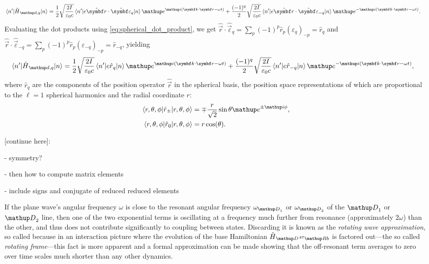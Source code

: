 \begin{align}
\matrixel{n^\prime}{\hat H_{\up{d},q}}{n} &= 
\frac12\sqrt{\frac{2I}{\varepsilon_0 c}}
\matrixel{n^\prime}
  {e\hat{\vec r}\cdot\hat{\vec\varepsilon}_q}
  {n}\ee^{\ii(\vec k \cdot \vec r - \omega t)}
+\frac{(-1)^q}2\sqrt{\frac{2I}{\varepsilon_0 c}}
\matrixel{n^\prime}
  {e\hat{\vec r}\cdot\hat{\vec\varepsilon}_{-q}}
  {n} \ee^{-\ii(\vec k \cdot \vec r - \omega t)}.
\end{align}
Evaluating the dot products using \eqref{eq:spherical_dot_product}, we get $\hat{\vec r}\cdot \hat{\vec\varepsilon}_q = \sum_p (-1)^p \hat r_p (\varepsilon_q)_{-p} = \hat r_q$ and $\hat{\vec r}\cdot \hat{\vec\varepsilon}_{-q} = \sum_p (-1)^p \hat r_p (\varepsilon_{-q})_{-p} = \hat r_{-q}$, yielding
\begin{align}
\matrixel{n^\prime}{\hat H_{\up{d},q}}{n} &= 
\frac12\sqrt{\frac{2I}{\varepsilon_0 c}}
\matrixel{n^\prime}
  {e\hat r_q}
  {n}\ee^{\ii(\vec k \cdot \vec r - \omega t)}
+\frac{(-1)^q}2\sqrt{\frac{2I}{\varepsilon_0 c}}
\matrixel{n^\prime}
  {e\hat r_{-q}}
  {n} \ee^{-\ii(\vec k \cdot \vec r - \omega t)},
\end{align}
where $\hat r_q$ are the components of the position operator $\hat{\vec r}$ in the spherical basis, the position space representations of which are proportional to the $\ell=1$ spherical harmonics and the radial coordinate $r$:
\begin{align}
\matrixel{r, \theta, \phi}{\hat r_\pm}{r, \theta, \phi}
    &= \mp\frac r {\sqrt2}\sin\theta\ee^{\pm\ii\phi},\\
\matrixel{r, \theta, \phi}{\hat r_0}{r, \theta, \phi} &= r\cos(\theta).
\end{align}

[continue here]:

- symmetry?

- then how to compute matrix elements

- include signs and conjugate of reduced reduced elements

If the plane wave's angular frequency $\omega$ is close to the resonant angular frequency $\omega_{\up{D}_1}$ or $\omega_{\up{D}_2}$ of the $\up{D}_1$ or $\up{D}_2$ line, then one of the two exponential terms is oscillating at a frequency much further from resonance (approximately $2\omega$) than the other, and thus does not contribute significantly to coupling between states. Discarding it is known as the \emph{rotating wave approximation}, so called because in an interaction picture where the evolution of the base Hamiltonian $\hat H_{\up{D}\,^{87}\up{Rb}}$ is factored out---the so called \emph{rotating frame}---this fact is more apparent and a formal approximation can be made showing that the off-resonant term averages to zero over time scales much shorter than any other dynamics.
